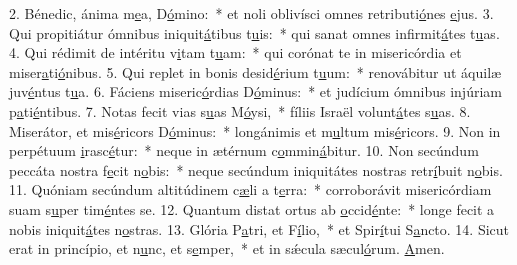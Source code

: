 2. Bénedic, ánima m\uline{e}a, D\uline{ó}mino:~* et noli oblivísci omnes retributi\uline{ó}nes \uline{e}jus.
3. Qui propitiátur ómnibus iniquit\uline{á}tibus t\uline{u}is:~* qui sanat omnes infirmit\uline{á}tes t\uline{u}as.
4. Qui rédimit de intéritu v\uline{i}tam t\uline{u}am:~* qui corónat te in misericórdia et miser\uline{a}ti\uline{ó}nibus.
5. Qui replet in bonis desid\uline{é}rium t\uline{u}um:~* renovábitur ut áquilæ juv\uline{é}ntus t\uline{u}a.
6. Fáciens miseric\uline{ó}rdias D\uline{ó}minus:~* et judícium ómnibus injúriam p\uline{a}ti\uline{é}ntibus.
7. Notas fecit vias s\uline{u}as M\uline{ó}ysi,~* fíliis Israël volunt\uline{á}tes s\uline{u}as.
8. Miserátor, et mis\uline{é}ricors D\uline{ó}minus:~* longánimis et m\uline{u}ltum mis\uline{é}ricors.
9. Non in perpétuum \uline{i}rasc\uline{é}tur:~* neque in ætérnum c\uline{o}mmin\uline{á}bitur.
10. Non secúndum peccáta nostra f\uline{e}cit n\uline{o}bis:~* neque secúndum iniquitátes nostras retr\uline{í}buit n\uline{o}bis.
11. Quóniam secúndum altitúdinem c\uline{æ}li a t\uline{e}rra:~* corroborávit misericórdiam suam s\uline{u}per tim\uline{é}ntes se.
12. Quantum distat ortus ab \uline{o}ccid\uline{é}nte:~* longe fecit a nobis iniquit\uline{á}tes n\uline{o}stras.
13. Glória P\uline{a}tri, et F\uline{í}lio,~* et Spir\uline{í}tui S\uline{a}ncto.
14. Sicut erat in princípio, et n\uline{u}nc, et s\uline{e}mper,~* et in sǽcula sæcul\uline{ó}rum. \uline{A}men.
